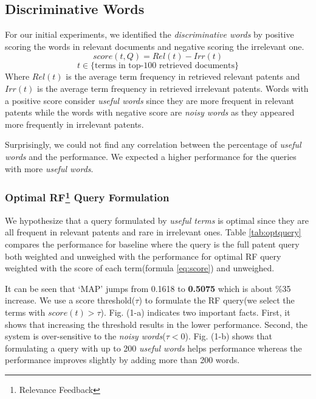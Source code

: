 \documentclass{sig-alternate}
\begin{document}
\subsection{Discriminative Words}
For our initial experiments, we identified the {\em discriminative words} by positive scoring the words in relevant documents and negative scoring the irrelevant one. 
\begin{equation}
score(t,Q)=Rel(t)-Irr(t) 
 \label{eq:score}
\end{equation}\vspace*{-5ex}
\begin{displaymath}t\in \lbrace \mbox{terms in top-100 retrieved documents}\rbrace\end{displaymath}
Where $ Rel(t) $ is the average term frequency in retrieved relevant patents and $ Irr(t) $ is the average term frequency in retrieved irrelevant patents. Words with a positive score consider {\em useful words} since they are more frequent in relevant patents while the words with negative score are {\em noisy words} as they appeared more frequently in irrelevant patents. 

Surprisingly, we could not find any correlation between the percentage of {\em useful words} and the performance. We expected a higher performance for the queries with more {\em useful words}. 

\subsubsection{Optimal RF\protect\footnote{Relevance Feedback} Query Formulation}
We hypothesize that a query formulated by {\em useful terms} is optimal since they are all frequent in relevant patents and rare in irrelevant ones. Table \ref{tab:optquery} compares the performance for baseline where the query is the full patent query both weighted and unweighed with the performance for optimal RF query weighted with the score of each term(formula \ref{eq:score}) and unweighed. 

\begin{table}[htpb]
  \begin{center}
   \caption{.}
     
  \label{tab:optquery}
  \end{center}  
\end{table}

It can be seen that `MAP' jumps from 0.1618 to \textbf{0.5075} which is about \%35 increase. We use a score threshold($\tau$) to formulate the RF query(we select the terms with $ score(t)>\tau $). Fig. (1-a) indicates two important facts. First, it shows that increasing the threshold results in the lower performance. Second, the system is over-sensitive to the {\em noisy words}($ \tau<0 $).  Fig. (1-b) shows that formulating a query with up to 200 {\em useful words} helps performance whereas the performance improves slightly by adding more than 200 words. 
\end{document}
